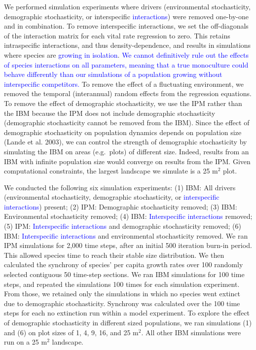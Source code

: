 \documentclass[12pt,]{article}
\begin{document}
We performed simulation experiments where drivers (environmental
stochasticity, demographic stochasticity, or interspecific
\textcolor{blue}{interactions}) were removed one-by-one and in
combination. To remove interspecific interactions, we set the
off-diagonals of the interaction matrix for each vital rate regression
to zero. This retains intraspecific interactions, and thus
density-dependence, and results in simulations where species are
\textcolor{blue}{growing in isolation}.
\textcolor{blue}{We cannot definitively rule out the effects of species interactions on all parameters, meaning that a true monoculture could behave differently than our simulations of a population growing without interspecific competitors.}
To remove the effect of a fluctuating environment, we removed the
temporal (interannual) random effects from the regression equations. To
remove the effect of demographic stochasticity, we use the IPM rather
than the IBM because the IPM does not include demographic stochasticity
(demographic stochasticity cannot be removed from the IBM). Since the
effect of demographic stochasticity on population dynamics depends on
population size (Lande et al. 2003), we can control the strength of
demographic stochasticity by simulating the IBM on areas (e.g.~plots) of
different size. Indeed, results from an IBM with infinite population
size would converge on results from the IPM. Given computational
constraints, the largest landscape we simulate is a 25 \(\text{m}^2\)
plot.

We conducted the following six simulation experiments: (1) IBM: All
drivers (environmental stochasticity, demographic stochasticity, or
\textcolor{blue}{interspecific interactions}) present; (2) IPM:
Demographic stochasticity removed; (3) IBM: Environmental stochasticity
removed; (4) IBM: \textcolor{blue}{Interspecific interactions} removed;
(5) IPM: \textcolor{blue}{Interspecific interactions} and demographic
stochasticity removed; (6) IBM:
\textcolor{blue}{Interspecific interactions} and environmental
stochasticity removed. We ran IPM simulations for 2,000 time steps,
after an initial 500 iteration burn-in period. This allowed species time
to reach their stable size distribution. We then calculated the
synchrony of species' per capita growth rates over 100 randomly selected
contiguous 50 time-step sections. We ran IBM simulations for 100 time
steps, and repeated the simulations 100 times for each simulation
experiment. From those, we retained only the simulations in which no
species went extinct due to demographic stochasticity. Synchrony was
calculated over the 100 time steps for each no extinction run within a
model experiment. To explore the effect of demographic stochasticity in
different sized populations, we ran simulations (1) and (6) on plot
sizes of 1, 4, 9, 16, and 25 \(\text{m}^2\). All other IBM simulations
were run on a 25 \(\text{m}^2\) landscape.
\end{document}
